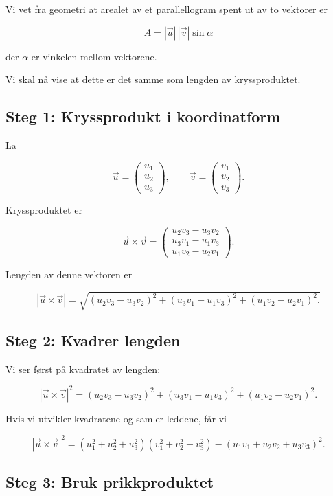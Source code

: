 \documentclass[a4paper,12pt]{article}
\begin{document}
Vi vet fra geometri at arealet av et parallellogram spent ut av to vektorer er

\[
A = |\vec u|\,|\vec v|\sin\alpha
\]

der $\alpha$ er vinkelen mellom vektorene.

Vi skal nå vise at dette er det samme som lengden av kryssproduktet.

\subsection*{Steg 1: Kryssprodukt i koordinatform}

La

\[
\vec u =
\begin{pmatrix}
u_1\\
u_2\\
u_3
\end{pmatrix},
\qquad
\vec v =
\begin{pmatrix}
v_1\\
v_2\\
v_3
\end{pmatrix}.
\]

Kryssproduktet er

\[
\vec u \times \vec v =
\begin{pmatrix}
u_2v_3-u_3v_2 \\
u_3v_1-u_1v_3 \\
u_1v_2-u_2v_1
\end{pmatrix}.
\]

Lengden av denne vektoren er

\[
|\vec u \times \vec v|
=
\sqrt{
(u_2v_3-u_3v_2)^2
+
(u_3v_1-u_1v_3)^2
+
(u_1v_2-u_2v_1)^2.
}
\]

\subsection*{Steg 2: Kvadrer lengden}

Vi ser først på kvadratet av lengden:

\[
|\vec u \times \vec v|^2
=
(u_2v_3-u_3v_2)^2
+
(u_3v_1-u_1v_3)^2
+
(u_1v_2-u_2v_1)^2.
\]

Hvis vi utvikler kvadratene og samler leddene, får vi

\[
|\vec u \times \vec v|^2
=
(u_1^2+u_2^2+u_3^2)(v_1^2+v_2^2+v_3^2)
-
(u_1v_1+u_2v_2+u_3v_3)^2.
\]

\subsection*{Steg 3: Bruk prikkproduktet}
\end{document}
